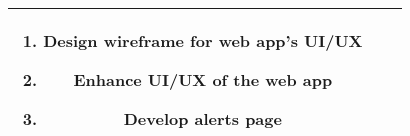 \begin{table}[htbp]
\begin{center}
\begin{tabular}{|c|c|p{3cm}|}
\begin{enumerate}[leftmargin=*]
				                                         \item Design wireframe for web app's UI/UX
				                                         \item Enhance UI/UX of the web app
				                                         \item Develop alerts page
			                                         \end{enumerate}
			\\
			\hline
		\end{tabular}
		\label{tab-divsion-of-task}
	\end{center}
\end{table}